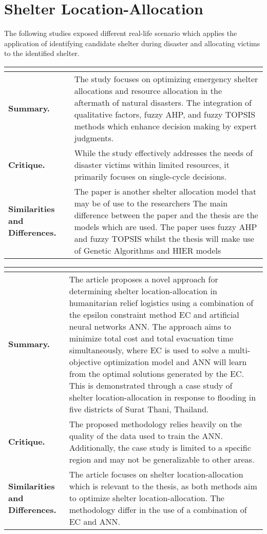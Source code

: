 \section{Shelter Location-Allocation}

 The following studies exposed different real-life scenario which applies the application of identifying candidate shelter during disaster and allocating victims to the identified shelter. 

\begin{longtable}{|L{.2\linewidth}|L{.74\linewidth}|}
	\hline
	\\ \hline
	\textbf{Summary.} & The study focuses on optimizing emergency shelter allocations and resource allocation in the aftermath of natural disasters. The integration of qualitative factors, fuzzy AHP, and fuzzy TOPSIS methods which enhance decision making by expert judgments.\\ \hline
	\textbf{Critique.} & While the study effectively addresses the needs of disaster victims within limited resources, it primarily focuses on single-cycle decisions.\\ \hline
	\textbf{Similarities and Differences.} & The paper is another shelter allocation model that may be of use to the researchers	The main difference between the paper and the thesis are the models which are used. The paper uses fuzzy AHP and fuzzy TOPSIS whilst the thesis will make use of Genetic Algorithms and HIER models \\ \hline
\end{longtable}

\begin{longtable}{|L{.2\linewidth}|L{.74\linewidth}|}
	\hline
	\\ \hline
	\textbf{Summary.} & The article proposes a novel approach for determining shelter location-allocation in humanitarian relief logistics using a combination of the epsilon constraint method EC and artificial neural networks ANN. The approach aims to minimize total cost and total evacuation time simultaneously, where EC is used  to solve a multi-objective optimization model and ANN will learn from the optimal solutions generated by the EC. This is demonstrated through a case study of shelter location-allocation in response to flooding in five districts of Surat Thani, Thailand.\\ \hline
	\textbf{Critique.} & The proposed methodology relies heavily on the quality of the data used to train the ANN. Additionally, the case study is limited to a specific region and may not be generalizable to other areas.\\ \hline
	\textbf{Similarities and Differences.} & The article focuses on shelter location-allocation which is relevant to the thesis, as both methods aim to optimize shelter location-allocation.	The methodology differ in the use of a combination of EC and ANN. \\ \hline
\end{longtable}


